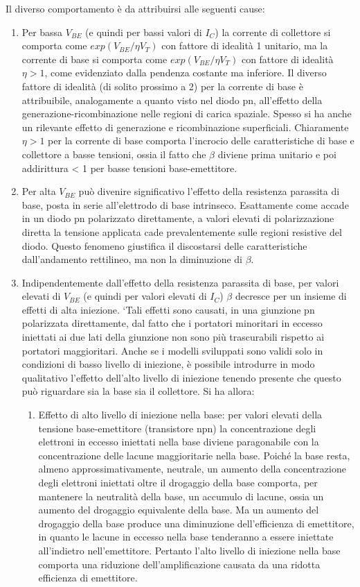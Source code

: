 Il diverso comportamento è da attribuirsi alle seguenti cause:  
\begin{enumerate}
    \item Per bassa $V_{BE}$ (e quindi per bassi valori di $I_C$) la corrente di collettore si comporta come $exp(V_{BE}/\eta V_T)$ con fattore di idealità 1 unitario, ma la corrente  di base si comporta come $exp(V_{BE}/\eta V_T)$ con fattore di idealità $\eta >1$, come evidenziato dalla pendenza costante ma inferiore. Il diverso fattore di idealità (di solito prossimo a 2) per la corrente di base è attribuibile, analogamente a quanto visto nel diodo pn, all'effetto della generazione-ricombinazione nelle regioni di carica spaziale. Spesso si ha anche un rilevante effetto di generazione e ricombinazione superficiali. Chiaramente $\eta> 1$ per la corrente di base comporta l'incrocio delle caratteristiche di base e collettore a basse tensioni, ossia il fatto che $\beta$ diviene prima unitario e poi addirittura < 1 per basse tensioni base-emettitore.  
    \item Per alta $V_{BE}$ può divenire significativo l'effetto della resistenza parassita di base, posta in serie all'elettrodo di base intrinseco. Esattamente come accade in un diodo pn polarizzato direttamente, a valori elevati di polarizzazione diretta la tensione applicata cade prevalentemente sulle regioni resistive del diodo. Questo fenomeno giustifica il discostarsi delle caratteristiche dall'andamento rettilineo, ma non la diminuzione di $\beta$.
    \item   Indipendentemente dall'effetto della resistenza parassita di base, per valori elevati di $V_{BE}$ (e quindi per valori elevati di $I_C$) $\beta$ decresce per un insieme di effetti di alta iniezione. ‘Tali effetti sono causati, in una giunzione pn polarizzata direttamente, dal fatto che i portatori minoritari in eccesso iniettati ai due lati della giunzione non sono più trascurabili rispetto ai portatori maggioritari. Anche se i modelli sviluppati sono validi solo in condizioni di basso livello di iniezione, è possibile introdurre in modo qualitativo l'effetto dell'alto livello di iniezione tenendo presente che questo può riguardare sia la base sia il collettore. Si ha allora:  
\begin{enumerate}
    \item     Effetto di alto livello di iniezione nella base: per valori elevati della tensione base-emettitore (transistore npn) la concentrazione degli elettroni  in eccesso iniettati nella base diviene paragonabile con la concentrazione delle lacune maggioritarie nella base. Poiché la base resta, almeno approssimativamente, neutrale, un aumento della concentrazione degli elettroni iniettati oltre il drogaggio della base comporta, per mantenere la neutralità della base, un accumulo di lacune, ossia un aumento del drogaggio equivalente della base. Ma un aumento del drogaggio della base produce una diminuzione dell'efficienza di emettitore, in quanto le lacune in eccesso nella base tenderanno a essere iniettate all'indietro nell'emettitore. Pertanto l'alto livello di iniezione nella base comporta una riduzione dell'amplificazione causata da una ridotta efficienza di emettitore.  

\end{enumerate}
\end{enumerate}
